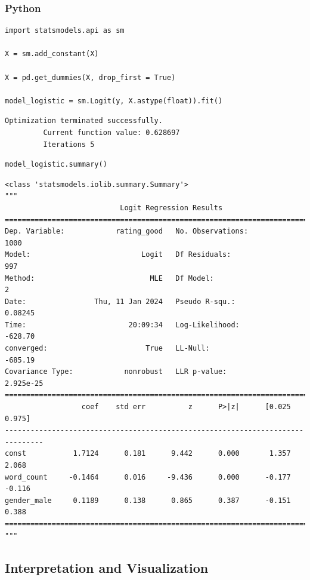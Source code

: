\documentclass[
  letterpaper,
]{krantz}
\begin{document}
\subsubsection{Python}

\begin{verbatim}
import statsmodels.api as sm

X = sm.add_constant(X)

X = pd.get_dummies(X, drop_first = True)

model_logistic = sm.Logit(y, X.astype(float)).fit()
\end{verbatim}

\begin{verbatim}
Optimization terminated successfully.
         Current function value: 0.628697
         Iterations 5
\end{verbatim}

\begin{verbatim}
model_logistic.summary()
\end{verbatim}

\begin{verbatim}
<class 'statsmodels.iolib.summary.Summary'>
"""
                           Logit Regression Results                           
==============================================================================
Dep. Variable:            rating_good   No. Observations:                 1000
Model:                          Logit   Df Residuals:                      997
Method:                           MLE   Df Model:                            2
Date:                Thu, 11 Jan 2024   Pseudo R-squ.:                 0.08245
Time:                        20:09:34   Log-Likelihood:                -628.70
converged:                       True   LL-Null:                       -685.19
Covariance Type:            nonrobust   LLR p-value:                 2.925e-25
===============================================================================
                  coef    std err          z      P>|z|      [0.025      0.975]
-------------------------------------------------------------------------------
const           1.7124      0.181      9.442      0.000       1.357       2.068
word_count     -0.1464      0.016     -9.436      0.000      -0.177      -0.116
gender_male     0.1189      0.138      0.865      0.387      -0.151       0.388
===============================================================================
"""
\end{verbatim}

\subsection{Interpretation and
Visualization}\label{sec-glm-binomial-interpret}
\end{document}
